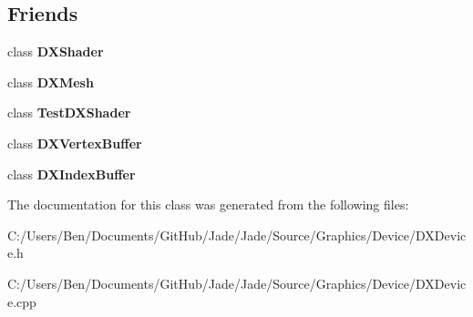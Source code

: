 \subsection*{Friends}
\begin{DoxyCompactItemize}
\item 
\hypertarget{class_jade_1_1_graphics_1_1_d_x_device_afc213dbf8dcf10af02c807d991cab9f7}{}class {\bfseries D\+X\+Shader}\label{class_jade_1_1_graphics_1_1_d_x_device_afc213dbf8dcf10af02c807d991cab9f7}

\item 
\hypertarget{class_jade_1_1_graphics_1_1_d_x_device_a47fae447f05ec6db04250b6093adec40}{}class {\bfseries D\+X\+Mesh}\label{class_jade_1_1_graphics_1_1_d_x_device_a47fae447f05ec6db04250b6093adec40}

\item 
\hypertarget{class_jade_1_1_graphics_1_1_d_x_device_a33952cda854c8325e4cc3f0aa35e48db}{}class {\bfseries Test\+D\+X\+Shader}\label{class_jade_1_1_graphics_1_1_d_x_device_a33952cda854c8325e4cc3f0aa35e48db}

\item 
\hypertarget{class_jade_1_1_graphics_1_1_d_x_device_ab1c2886b57327c3f08e0ba41989588a0}{}class {\bfseries D\+X\+Vertex\+Buffer}\label{class_jade_1_1_graphics_1_1_d_x_device_ab1c2886b57327c3f08e0ba41989588a0}

\item 
\hypertarget{class_jade_1_1_graphics_1_1_d_x_device_a3417e929cc483ce8875bdd8a9ae61c31}{}class {\bfseries D\+X\+Index\+Buffer}\label{class_jade_1_1_graphics_1_1_d_x_device_a3417e929cc483ce8875bdd8a9ae61c31}

\end{DoxyCompactItemize}


The documentation for this class was generated from the following files\+:\begin{DoxyCompactItemize}
\item 
C\+:/\+Users/\+Ben/\+Documents/\+Git\+Hub/\+Jade/\+Jade/\+Source/\+Graphics/\+Device/D\+X\+Device.\+h\item 
C\+:/\+Users/\+Ben/\+Documents/\+Git\+Hub/\+Jade/\+Jade/\+Source/\+Graphics/\+Device/D\+X\+Device.\+cpp\end{DoxyCompactItemize}
